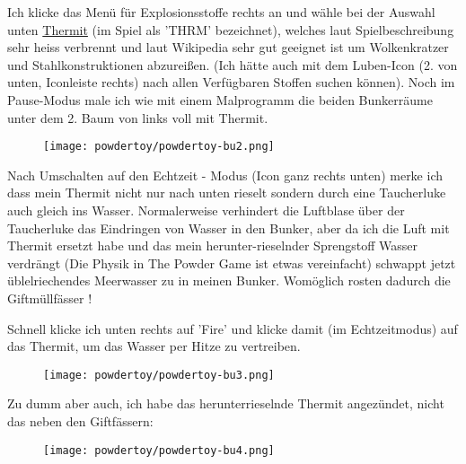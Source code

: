 \documentclass[10pt,a4paper,ngerman,twoside]{article} %
\begin{document}
Ich klicke das Menü für Explosionsstoffe rechts an und wähle bei der Auswahl unten \href{https://de.wikipedia.org/wiki/Thermit}{Thermit} (im Spiel als 'THRM' bezeichnet), welches laut Spielbeschreibung sehr heiss verbrennt und laut Wikipedia sehr gut geeignet ist um Wolkenkratzer und Stahlkonstruktionen abzureißen. (Ich hätte auch mit dem Luben-Icon (2. von unten, Iconleiste rechts) nach allen Verfügbaren Stoffen suchen können). Noch im Pause-Modus male ich wie mit einem Malprogramm die beiden Bunkerräume unter dem 2. Baum von links voll mit Thermit.
\begin{figure}
\texttt{[image: powdertoy/powdertoy-bu2.png]}
\end{figure}
Nach Umschalten auf den Echtzeit - Modus (Icon ganz rechts unten) merke ich dass mein Thermit nicht nur nach unten rieselt sondern durch eine Taucherluke auch gleich ins Wasser. Normalerweise verhindert die Luftblase über der Taucherluke das Eindringen von Wasser in den Bunker, aber da ich die Luft mit Thermit ersetzt habe und das mein herunter-rieselnder Sprengstoff Wasser verdrängt (Die Physik in The Powder Game ist etwas vereinfacht) schwappt jetzt üblelriechendes Meerwasser zu in meinen Bunker. Womöglich rosten dadurch die Giftmüllfässer ! 

Schnell klicke ich unten rechts auf 'Fire' und klicke damit (im Echtzeitmodus) auf das Thermit, um das Wasser per Hitze zu vertreiben.
\begin{figure}
\texttt{[image: powdertoy/powdertoy-bu3.png]}
\end{figure}

Zu dumm aber auch, ich habe das herunterrieselnde Thermit angezündet, nicht das neben den Giftfässern:
\begin{figure}
\texttt{[image: powdertoy/powdertoy-bu4.png]}
\end{figure}
\end{document}
